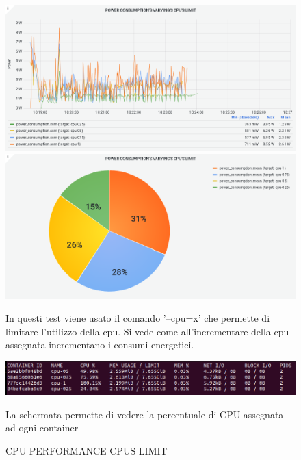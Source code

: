 \documentclass[10pt,a4paper]{article}
\begin{document}
\begin{figure}[h]
\caption{CPU-PERFORMANCE-CPUS-LIMIT}
\centering
\includegraphics[scale=0.4]{image30}
\includegraphics[scale=0.4]{image35}
\begin{flushleft}
In questi test viene usato il comando '--cpu=x' che permette di limitare l'utilizzo della cpu.
Si vede come all'incrementare della cpu assegnata incrementano i consumi energetici.
\end{flushleft}
\includegraphics[scale=0.4]{cpus}
\begin{flushleft}
{La schermata permette di vedere la percentuale di CPU assegnata ad ogni container}
\end{flushleft}
\end{figure}
\end{document}
